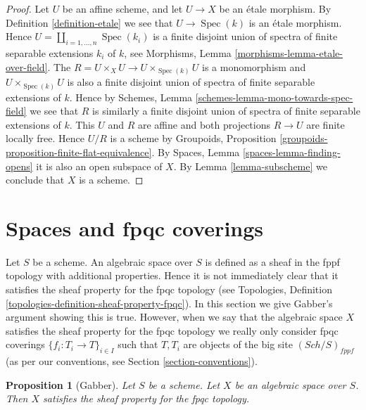 \documentclass{stacks-project}
\theoremstyle{plain}
\newtheorem{proposition}[subsection]{Proposition}
\theoremstyle{definition}
\theoremstyle{remark}
\numberwithin{equation}{subsection}
\def\Spec{\mathop{\mathrm{Spec}}}
\def\Sch{\mathit{Sch}}
\begin{document}
\begin{proof}
Let $U$ be an affine scheme, and let $U \to X$ be an \'etale morphism. By
Definition \ref{definition-etale}
we see that $U \to \Spec(k)$ is an \'etale
morphism. Hence $U = \coprod_{i = 1, \ldots, n} \Spec(k_i)$
is a finite disjoint union of spectra of finite separable extensions
$k_i$ of $k$, see
Morphisms, Lemma \ref{morphisms-lemma-etale-over-field}.
The $R = U \times_X U \to U \times_{\Spec(k)} U$ is a monomorphism
and $U \times_{\Spec(k)} U$ is also a finite disjoint union of
spectra of finite separable extensions of $k$. Hence by
Schemes, Lemma \ref{schemes-lemma-mono-towards-spec-field}
we see that $R$ is similarly a finite disjoint union of
spectra of finite separable extensions of $k$.
This $U$ and $R$ are affine and
both projections $R \to U$ are finite locally free.
Hence $U/R$ is a scheme by
Groupoids, Proposition \ref{groupoids-proposition-finite-flat-equivalence}.
By
Spaces, Lemma \ref{spaces-lemma-finding-opens}
it is also an open subspace of $X$. By
Lemma \ref{lemma-subscheme}
we conclude that $X$ is a scheme.
\end{proof}













\section{Spaces and fpqc coverings}
\label{section-fpqc}

\noindent
Let $S$ be a scheme.
An algebraic space over $S$ is defined as a sheaf in the fppf topology with
additional properties. Hence it is not immediately clear that it satisfies
the sheaf property for the fpqc topology (see
Topologies, Definition \ref{topologies-definition-sheaf-property-fpqc}).
In this section we give Gabber's argument showing this is true.
However, when we say that the algebraic space $X$ satisfies the
sheaf property for the fpqc topology we really only consider fpqc
coverings $\{f_i : T_i \to T\}_{i \in I}$ such that $T, T_i$ are
objects of the big site $(\Sch/S)_{fppf}$ (as per
our conventions, see Section \ref{section-conventions}).

\begin{proposition}[Gabber]
\label{proposition-sheaf-fpqc}
Let $S$ be a scheme. Let $X$ be an algebraic space over $S$. Then
$X$ satisfies the sheaf property for the fpqc topology.
\end{proposition}
\end{document}
